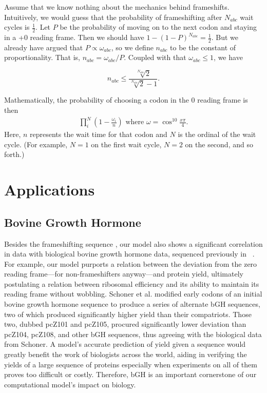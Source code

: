 \documentclass[12pt, draft]{article}
\numberwithin{equation}{section}
\begin{document}
Assume that we know nothing about the mechanics behind frameshifts.
Intuitively, we would guess that the probability of frameshifting
after $N_{abc}$ wait cycles is $\frac{1}{2}$.  Let $P$ be the
probability of moving on to the next codon and staying in a +0 reading
frame.  Then we should have $1-\left(1-P\right)^{N_{abc}} =
\frac{1}{2}$.  But we already have argued that $P \propto
\omega_{abc}$, so we define $n_{abc}$ to be the constant of
proportionality. That is, $n_{abc} = \omega_{abc} / P$.  Coupled
with that $\omega_{abc} \le 1$, we have

\begin{equation}
  n_{abc} \le \frac{\sqrt[N_{abc}]{2}}{\sqrt[N_{abc}]{2} - 1}.
\end{equation}

Mathematically, the probability of choosing a codon in the 0 reading frame is then
\begin{align}
  \prod_i^N \left(1-\frac{\omega_i}{n}\right) \text{ where } \omega = \cos^{10}{\frac{x\pi}{4}}.
\end{align}
Here, $n$ represents the wait time for that codon and $N$ is the ordinal of the wait cycle. (For example,
$N=1$ on the first wait cycle, $N=2$ on the second, and so forth.)

\section{Applications}

\subsection{Bovine Growth Hormone}
Besides the frameshifting sequence \prfB, our model also shows a significant correlation in data with biological
bovine growth hormone data, sequenced previously in \ecoli~\cite{schoner:bgh}. For example, our model purports a relation
between the deviation from the zero reading frame---for non-frameshifters anyway---and protein yield, ultimately postulating
a relation between ribosomal efficiency and its ability to maintain its reading frame without wobbling. Schoner et al.
modified early codons of an initial bovine growth hormone sequence to produce a series of alternate bGH sequences,
two of which produced significantly higher yield than their compatriots. Those two, dubbed pcZ101 and pcZ105, procured significantly
lower deviation than pcZ104, pcZ108, and other bGH sequences, thus agreeing with the biological data from Schoner.
A model's accurate prediction of yield given a sequence would greatly benefit the work of biologists across the world,
aiding in verifying the yields of a large sequence of proteins especially when experiments on all of them proves too difficult
or costly. Therefore, bGH is an important cornerstone of our computational model's impact on biology.
\end{document}
